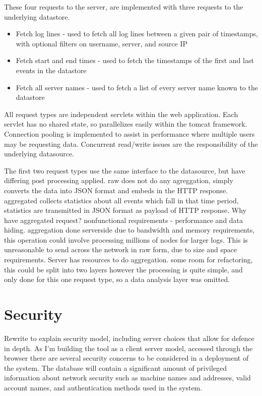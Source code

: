 These four requests to the server, are implemented with three requests to the underlying datastore.

\begin{itemize}
\item{Fetch log lines - used to fetch all log lines between a given pair of timestamps, with optional filters on username, server, and source IP}
\item{Fetch start and end times - used to fetch the timestamps of the first and last events in the datastore}
\item{Fetch all server names - used to fetch a list of every server name known to the datastore}
\end{itemize}

All request types are independent servlets within the web application. Each servlet has no shared state, so parallelizes easily within the tomcat framework. Connection pooling is implemented to assist in performance where multiple users may be requesting data. Concurrent read/write issues are the responsibility of the underlying datasource.

The first two request types use the same interface to the datasource, but have differing post processing applied. raw does not do any agreggation, simply converts the data into JSON format and embeds in the HTTP response. aggregated collects statistics about all events which fall in that time period, statistics are transmitted in JSON format as payload of HTTP response.
Why have aggregated request? nonfunctional requirements - performance and data hiding. aggregation done serverside due to bandwidth and memory requirements, this operation could involve processing millions of nodes for larger logs. This is unreasonable to send across the network in raw form, due to size and space requirements. Server has resources to do aggregation. 
some room for refactoring, this could be split into two layers
however the processing is quite simple, and only done for this one request type, so a data analysis layer was omitted.

\section{Security}
Rewrite to explain security model, including server choices that allow for defence in depth.
As I'm building the tool as a client server model, accessed through the browser
there are several security concerns to be considered in a deployment of the system.
The database will contain a significant amount of privileged information about network security such as machine names and addresses, valid account names, and authentication methods used in the system.

